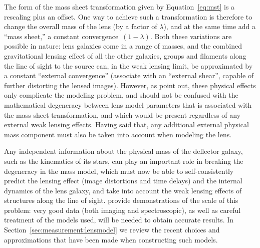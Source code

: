 The form of the mass sheet transformation given by Equation~\ref{eq:mst}
is a rescaling plus an offset. One way to achieve such a transformation
is therefore to change the overall mass of the lens (by a factor of
$\lambda$),   and at the same time add a ``mass sheet,'' a constant
convergence~$(1-\lambda)$.  Both these variations are possible in
nature: lens galaxies come in a range of masses, and  the combined
gravitational lensing effect of all the other galaxies, groups and
filaments along  the line of sight to the source can, in the weak
lensing limit, be approximated by a constant ``external convergence''
(associate with an ``external shear'', capable of further distorting the
lensed images). However, as \citet{S+S13} point out, these physical
effects only complicate the modeling problem, and should not be confused
with the mathematical degeneracy between lens model parameters that is
associated with the mass sheet transformation, and which would be
present regardless of any external weak lensing effects. Having said
that, any additional external physical mass component must also be taken
into account when modeling the lens.

Any independent information about  the physical mass of the deflector
galaxy, such as the kinematics of its stars, can play an important role
in breaking the degeneracy in the mass model, which must now be able to
self-consistently predict the lensing effect (image distortions and time
delays) and the internal dynamics of the lens galaxy, and take into
account the weak lensing effects of structures along the line of sight.
\citet{S+S13} provide demonstrations of the scale of this problem: very
good data (both imaging and spectroscopic), as well as careful treatment
of the models used, will be needed to obtain accurate results.  In
Section~\ref{sec:measurement:lensmodel} we review the recent choices and
approximations that have been made when constructing such models.


